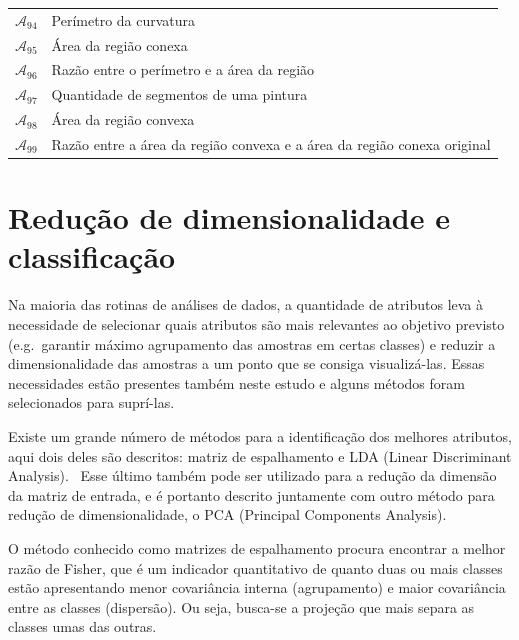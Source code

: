 \begin{table}
\begin{center}
\begin{tabular}{l|l}
    $\mathcal{A}_{94}$ &
    Perímetro da curvatura \\

    $\mathcal{A}_{95}$ &
    Área da região conexa \\

    $\mathcal{A}_{96}$ &
    Razão entre o perímetro e a área da região \\

    $\mathcal{A}_{97}$ &
    Quantidade de segmentos de uma pintura \\

    $\mathcal{A}_{98}$ &
    Área da região convexa \\

    $\mathcal{A}_{99}$ &
    Razão entre a área da região convexa e a área da região conexa original \\

    \hline
    \end{tabular}
  \end{center}
\end{table}

\section{Redução de dimensionalidade e classificação}
\label{sec:fund:reducao}

Na maioria das rotinas de análises de dados, a quantidade de atributos leva à
necessidade de selecionar quais atributos são mais relevantes ao objetivo
previsto (e.g.\ garantir máximo agrupamento das amostras em certas classes) e
reduzir a dimensionalidade das amostras a um ponto que se consiga
visualizá-las. Essas necessidades estão presentes também neste estudo e alguns
métodos foram selecionados para suprí-las.

Existe um grande número de métodos para a identificação dos melhores atributos,
aqui dois deles são descritos: matriz de espalhamento e LDA (Linear Discriminant
Analysis).~\cite{fisher,luciano,jain} Esse último também
pode ser utilizado para a redução da dimensão da matriz de entrada, e é portanto
descrito juntamente com outro método para redução de dimensionalidade, o PCA
(Principal Components Analysis).~\cite{luciano,dunteman}

O método conhecido como matrizes de espalhamento procura encontrar a melhor
razão de Fisher, que é um indicador quantitativo de quanto duas ou mais classes
estão apresentando menor covariância interna (agrupamento) e maior covariância
entre as classes (dispersão). Ou seja, busca-se a projeção que mais separa as
classes umas das outras.~\cite{fisher,luciano}

